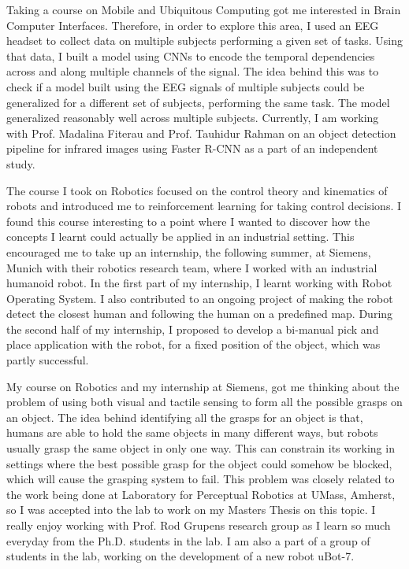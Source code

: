 \documentclass[10pt]{article}
\begin{document}
Taking a course on Mobile and Ubiquitous Computing got me interested in Brain Computer Interfaces. Therefore, in order to explore this area, I used an EEG headset to collect data on multiple subjects performing a given set of tasks. Using that data, I built a model using CNNs to encode the temporal dependencies across and along multiple channels of the signal. The idea behind this was to check if a model built using the EEG signals of multiple subjects could be generalized for a different set of subjects, performing the same task. The model generalized reasonably well across multiple subjects.  Currently, I am working with Prof. Madalina Fiterau and Prof. Tauhidur Rahman on an object detection pipeline for infrared images using Faster R-CNN as a part of an independent study. 
\par
The course I  took on Robotics focused on the control theory and kinematics of robots and introduced me to reinforcement learning for taking control decisions. I found this course interesting to a point where I wanted to discover how the concepts I learnt could actually be applied in an industrial setting. This encouraged me to take up an internship, the following summer, at Siemens, Munich with their robotics research team, where I worked with an industrial humanoid robot. In the first part of my internship, I learnt working with Robot Operating System. I also contributed to an ongoing project of making the robot detect the closest human and following the human on a predefined map. During the second half of my internship, I proposed to develop a bi-manual pick and place application with the robot, for a fixed position of the object, which was partly successful. 
\par
My course on Robotics and my internship at Siemens, got me thinking about the problem of using both visual and tactile sensing to form all the possible grasps on an object. The idea behind identifying all the grasps for an object is that, humans are able to hold the same objects in many different ways, but robots usually grasp the same object in only one way. This can constrain its working in settings where the best possible grasp for the object could somehow be blocked, which will cause the grasping system to fail. This problem was closely related to the work being done at Laboratory for Perceptual Robotics at UMass, Amherst, so I was accepted into the lab to work on my Master\textquotesingle s Thesis on this topic. I really enjoy working with Prof. Rod Grupen\textquotesingle s research group as I learn so much everyday from the Ph.D. students in the lab. I am also a part of a group of students in the lab, working on the development of a new robot uBot-7.
\end{document}
